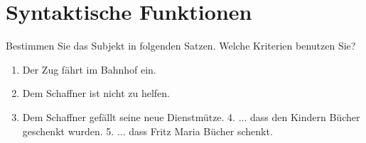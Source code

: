 \section{Syntaktische Funktionen}
Bestimmen Sie das Subjekt in folgenden Satzen. Welche Kriterien benutzen Sie?
\begin{enumerate}
  \item Der Zug fährt im Bahnhof ein.
  \item Dem Schaffner ist nicht zu helfen.
  \item Dem Schaffner gefällt seine neue Dienstmütze. 4. ... dass den Kindern Bücher geschenkt wurden. 5. ... dass Fritz Maria Bücher schenkt.
\end{enumerate}
